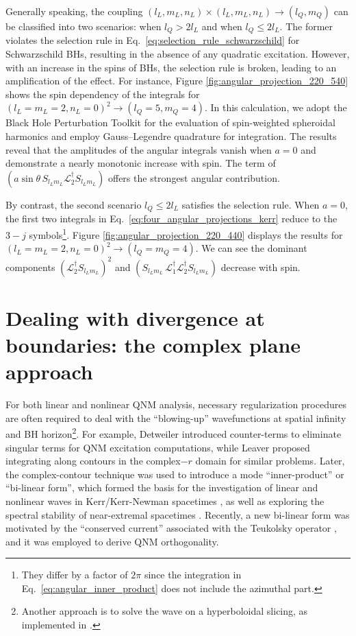 \documentclass[aps,prd,amsmath,floats,floatfix, twocolumn,
superscriptaddress,nofootinbib,showpacs]{revtex4-1}
\begin{document}
Generally speaking, the coupling $(l_L,m_L,n_L)\times (l_L,m_L,n_L) \to (l_Q,m_Q)$ can be classified into two scenarios: when $l_Q> 2l_L$ and when $l_Q\leq 2l_L$. The former violates the selection rule in Eq.~\eqref{eq:selection_rule_schwarzschild} for Schwarzschild BHs, resulting in the absence of any quadratic excitation. However, with an increase in the spins of BHs, the selection rule is broken, leading to an amplification of the effect. For instance, Figure \ref{fig:angular_projection_220_540} shows the spin dependency of the integrals for $(l_L=m_L=2,n_L=0)^2 \to (l_Q=5,m_Q=4)$. In this calculation, we adopt the Black Hole Perturbation Toolkit \cite{BHPToolkit} for the evaluation of spin-weighted spheroidal harmonics and employ Gauss–Legendre quadrature for integration. The results reveal that the amplitudes of the angular integrals vanish when $a=0$ and demonstrate a nearly monotonic increase with spin. The term of $(a\sin\theta\,S_{l_Lm_L} \mathcal{L}_2^\dagger S_{l_Lm_L})$ offers the strongest angular contribution.

By contrast, the second scenario $l_Q\leq 2l_L$ satisfies the selection rule. When $a=0$, the first two integrals in Eq.~\eqref{eq:four_angular_projections_kerr} reduce to the $3-j$ symbols\footnote{They differ by a factor of $2\pi$ since the integration in Eq.~\eqref{eq:angular_inner_product} does not include the azimuthal part.}. Figure \ref{fig:angular_projection_220_440} displays the results for $(l_L=m_L=2,n_L=0)^2 \to (l_Q=m_Q=4)$. We can see the dominant components $\left(\mathcal{L}_2^\dagger S_{l_Lm_L}\right)^2$ and $(S_{l_Lm_L}\,\mathcal{L}_1^\dagger\mathcal{L}_2^\dagger S_{l_Lm_L})$ decrease with spin.


\section{Dealing with divergence at boundaries: the complex plane approach}
\label{sec:contour}
For both linear and nonlinear QNM analysis, necessary regularization procedures are often required to deal with the ``blowing-up'' wavefunctions at spatial infinity and BH horizon\footnote{Another approach is to solve the wave on a hyperboloidal slicing, as implemented in \cite{Ripley:2020xby}.}. For example, Detweiler \cite{Detweiler:1979xr} introduced counter-terms to eliminate singular terms for QNM excitation computations, while Leaver \cite{Leaver:1986gd} proposed integrating along contours in the complex$-r$ domain for similar problems. Later, the complex-contour technique was used to introduce a mode ``inner-product'' or ``bi-linear form'', which formed the basis for the investigation of linear and nonlinear waves in Kerr/Kerr-Newman spacetimes \cite{Yang:2014tla, Mark:2014aja, Zimmerman:2014aha}, as well as exploring the spectral stability of near-extremal spacetimes \cite{Yang:2022wlm}. Recently, a new bi-linear form was motivated by the ``conserved current'' associated with the Teukolsky operator \cite{Green:2022htq}, and it was employed to derive QNM orthogonality.
\end{document}
